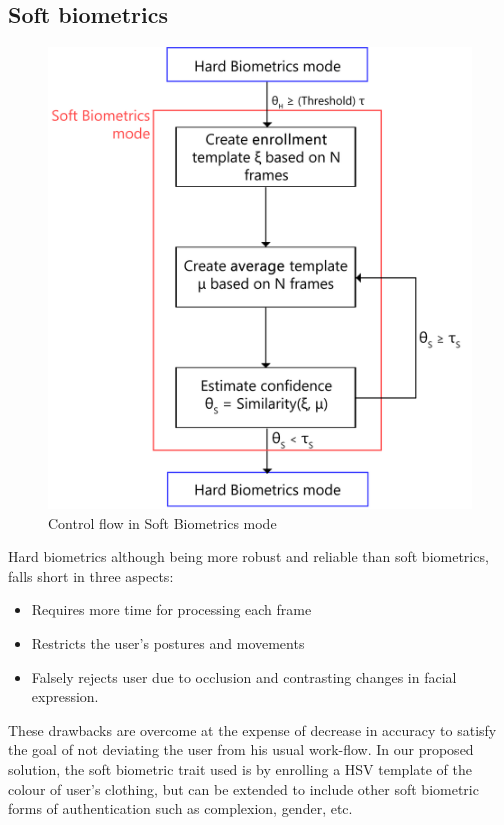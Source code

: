 \documentclass[%
        final,
        notitlepage,
        narroweqnarray,
        inline,
        ]{ieee}
\begin{document}
\subsection{Soft biometrics}
\begin{figure}[h!]
	\centering
	\includegraphics[scale=0.5]{img/soft_f.png}
	\caption{Control flow in Soft Biometrics mode}
	\label{fig:cfsb}
\end{figure}
Hard biometrics although being more robust and reliable than soft biometrics, falls short in three aspects\cite{Niin10}:
\begin{itemize}
	\item Requires more time for processing each frame
	\item Restricts the user's postures and movements
	\item Falsely rejects user due to occlusion and contrasting changes in facial expression.
\end{itemize}
These drawbacks are overcome at the expense of decrease in accuracy to satisfy the goal of not deviating the user from his usual work-flow. 
In our proposed solution, the soft biometric trait used is by enrolling a HSV template of the colour of user's clothing, but can be extended to include other soft biometric forms of authentication such as complexion, gender\cite{Jain204}, etc. 
\end{document}
